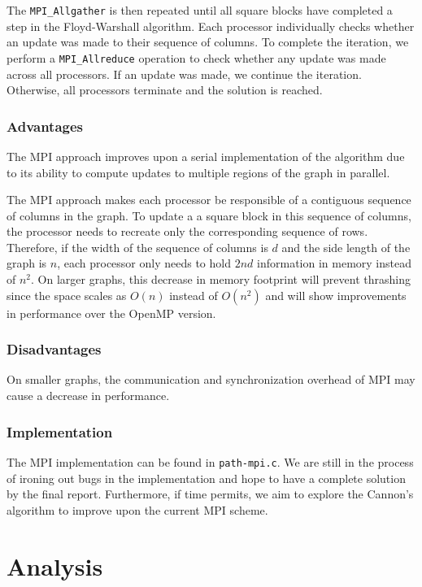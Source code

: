 \documentclass[11pt]{article}
\begin{document}
The \texttt{MPI\_Allgather} is then repeated until all square blocks have completed a step in the Floyd-Warshall algorithm. Each processor individually checks whether an update was made to their sequence of columns. To complete the iteration, we perform a \texttt{MPI\_Allreduce} operation to check whether any update was made across all processors. If an update was made, we continue the iteration. Otherwise, all processors terminate and the solution is reached.

\subsubsection{Advantages}

The MPI approach improves upon a serial implementation of the algorithm due to its ability to compute updates to multiple regions of the graph in parallel.
 
The MPI approach makes each processor be responsible of a contiguous sequence of columns in the graph. To update a a square block in this sequence of columns, the processor needs to recreate only the corresponding sequence of rows. Therefore, if the width of the sequence of columns is $d$ and the side length of the graph is $n$, each processor only needs to hold $2nd$ information in memory instead of $n^2$. On larger graphs, this decrease in memory footprint will prevent thrashing since the space scales as $O(n)$ instead of $O(n^2)$ and will show improvements in performance over the OpenMP version.

\subsubsection{Disadvantages}
On smaller graphs, the communication and synchronization overhead  of MPI may cause a decrease in performance.

\subsubsection{Implementation}
The MPI implementation can be found in \texttt{path-mpi.c}. We are still in the process of ironing out bugs in the implementation and hope to have a complete solution by the final report. Furthermore, if time permits, we aim to explore the Cannon's algorithm to improve upon the current MPI scheme. \cite{cannon}

\section{Analysis}
\end{document}
